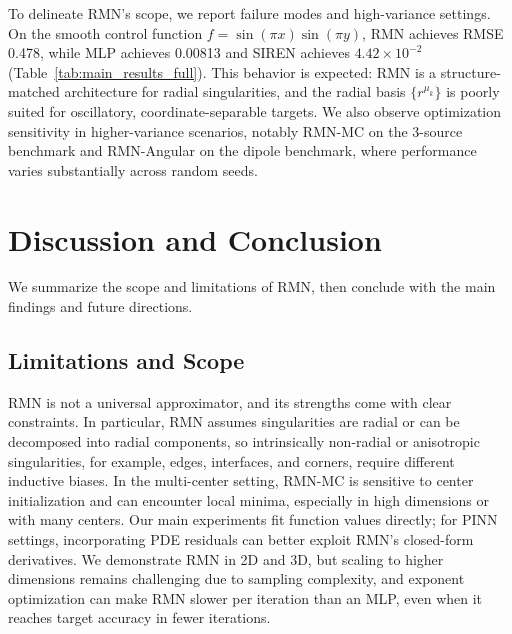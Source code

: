 \documentclass[twoside,11pt]{article}
\begin{document}
To delineate RMN's scope, we report failure modes and high-variance settings. On the smooth control function $f = \sin(\pi x)\sin(\pi y)$, RMN achieves RMSE 0.478, while MLP achieves 0.00813 and SIREN achieves $4.42 \times 10^{-2}$ (Table~\ref{tab:main_results_full}). This behavior is expected: RMN is a structure-matched architecture for radial singularities, and the radial basis $\{r^{\mu_k}\}$ is poorly suited for oscillatory, coordinate-separable targets. We also observe optimization sensitivity in higher-variance scenarios, notably RMN-MC on the 3-source benchmark and RMN-Angular on the dipole benchmark, where performance varies substantially across random seeds.


\section{Discussion and Conclusion}
\label{sec:discussion}

We summarize the scope and limitations of RMN, then conclude with the main findings and future directions.

\subsection{Limitations and Scope}

RMN is not a universal approximator, and its strengths come with clear constraints. In particular,
RMN assumes singularities are radial or can be decomposed into radial components, so intrinsically non-radial or anisotropic singularities, for example, edges, interfaces, and corners, require different inductive biases. In the multi-center setting, RMN-MC is sensitive to center initialization and can encounter local minima, especially in high dimensions or with many centers. Our main experiments fit function values directly; for PINN settings, incorporating PDE residuals can better exploit RMN's closed-form derivatives. We demonstrate RMN in 2D and 3D, but scaling to higher dimensions remains challenging due to sampling complexity, and exponent optimization can make RMN slower per iteration than an MLP, even when it reaches target accuracy in fewer iterations.

\end{document}
